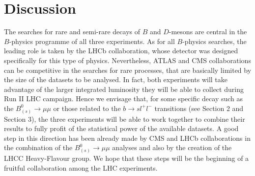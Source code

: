 %
%
%
%
%
%
%
%
%
\section{Discussion}
The searches for rare and semi-rare decays of $B$ and $D$-mesons are central in the $B$-physics programme of all three experiments. As for all $B$-physics searches, the leading role is taken by the LHCb collaboration, whose detector was designed specifically for this type of physics. Nevertheless, ATLAS and CMS collaborations can be competitive in the searches for rare processes, that are basically limited by the size of the datasets to be analysed. In fact, both experiments will take advantage of the larger integrated luminosity they will be able to collect during Run II LHC campaign. Hence we envisage that, for some specific decay such as the $B_{(s)}^0 \to \mu \mu$ or those related to the $b \to s l^+ l^-$ transitions (see Section 2 and Section 3), the three experiments will be able to work together to combine their results to fully profit of the statistical power of the available datasets. A good step in this direction has been already made by CMS and LHCb collaborations in the combination of the $B_{(s)}^0 \to \mu \mu$ analyses and also by the creation of the LHCC Heavy-Flavour group. We hope that these steps will be the beginning of a fruitful collaboration among the LHC experiments.
%